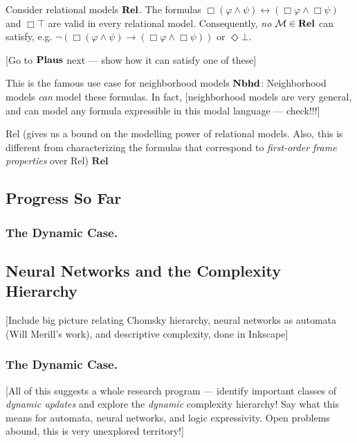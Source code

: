 \documentclass[letterpaper]{article}
\begin{document}
\begin{example*}
    Consider relational models $\textrm{\textbf{Rel}}$.  The formulas $\Box(\varphi \land \psi) \leftrightarrow (\Box \varphi \land \Box \psi)$ and $\Box \top$ are valid in every relational model.  Consequently, \emph{no} $\mathcal{M} \in \textrm{\textbf{Rel}}$ can satisfy, e.g. $\neg (\Box(\varphi \land \psi) \to (\Box \varphi \land \Box \psi))$ or $\Diamond \bot$.

    [Go to $\textrm{\textbf{Plaus}}$ next --- show how it can satisfy one of these]

    This is the famous use case for neighborhood models $\textrm{\textbf{Nbhd}}$: Neighborhood models \emph{can} model these formulas.  In fact, [neighborhood models are very general, and can model any formula expressible in this modal language --- check!!!]
    
    Rel (gives us a bound on the modelling power of relational models.  Also, this is different from characterizing the formulas that correspond to \emph{first-order frame properties} over Rel)
    $\textbf{Rel}$
\end{example*}

\subsection*{Progress So Far}


\subsubsection*{The Dynamic Case.}

\subsection*{Neural Networks and the Complexity Hierarchy}

[Include big picture relating Chomsky hierarchy, neural networks as automata (Will Merill's work), and descriptive complexity, done in Inkscape]

\subsubsection*{The Dynamic Case.}

[All of this suggests a whole research program --- identify important classes of \emph{dynamic updates} and explore the \emph{dynamic} complexity hierarchy! Say what this means for automata, neural networks, and logic expressivity.  Open problems abound, this is very unexplored territory!]

\printbibliography
\end{document}
